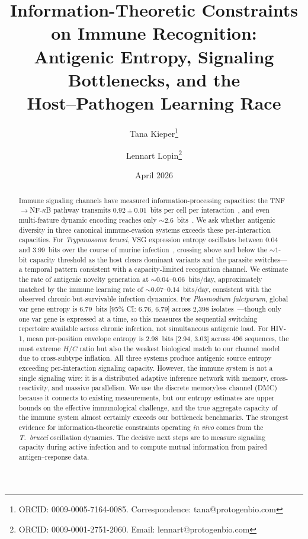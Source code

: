 \documentclass[twocolumn,10pt]{article}
\title{\textbf{Information-Theoretic Constraints on Immune Recognition:\\Antigenic Entropy, Signaling Bottlenecks, and the\\Host--Pathogen Learning Race}}
\author[1]{Tana Kieper\thanks{ORCID: 0009-0005-7164-0085. Correspondence: tana@protogenbio.com}}
\author[1]{Lennart Lopin\thanks{ORCID: 0009-0001-2751-2060. Email: lennart@protogenbio.com}}
\affil[1]{Protogen Bio Corporation}
\date{April 2026}
\begin{document}
\maketitle
\thispagestyle{empty}

\begin{abstract}
Immune signaling channels have measured information-processing capacities: the TNF$\to$NF-$\kappa$B pathway transmits $0.92 \pm 0.01$~bits per cell per interaction~\citep{cheong2011}, and even multi-feature dynamic encoding reaches only ${\sim}2.6$~bits~\citep{adelaja2021}.  We ask whether antigenic diversity in three canonical immune-evasion systems exceeds these per-interaction capacities.  For \textit{Trypanosoma brucei}, VSG expression entropy oscillates between 0.04 and 3.99~bits over the course of murine infection~\citep{mugnier2015}, crossing above and below the ${\sim}1$-bit capacity threshold as the host clears dominant variants and the parasite switches---a temporal pattern consistent with a capacity-limited recognition channel.  We estimate the rate of antigenic novelty generation at ${\sim}0.04\text{--}0.06$~bits/day, approximately matched by the immune learning rate of ${\sim}0.07\text{--}0.14$~bits/day, consistent with the observed chronic-but-survivable infection dynamics.  For \textit{Plasmodium falciparum}, global var gene entropy is $6.79$~bits [95\% CI: 6.76, 6.79] across 2,398 isolates~\citep{otto2019}---though only one var gene is expressed at a time, so this measures the sequential switching repertoire available across chronic infection, not simultaneous antigenic load.  For HIV-1, mean per-position envelope entropy is 2.98~bits [2.94, 3.03] across 496 sequences, the most extreme $H/C$ ratio but also the weakest biological match to our channel model due to cross-subtype inflation.  All three systems produce antigenic source entropy exceeding per-interaction signaling capacity.  However, the immune system is not a single signaling wire: it is a distributed adaptive inference network with memory, cross-reactivity, and massive parallelism.  We use the discrete memoryless channel (DMC) because it connects to existing measurements, but our entropy estimates are upper bounds on the effective immunological challenge, and the true aggregate capacity of the immune system almost certainly exceeds our bottleneck benchmarks.  The strongest evidence for information-theoretic constraints operating \textit{in vivo} comes from the \textit{T.~brucei} oscillation dynamics.  The decisive next steps are to measure signaling capacity during active infection and to compute mutual information from paired antigen--response data.
\end{abstract}
\end{document}

